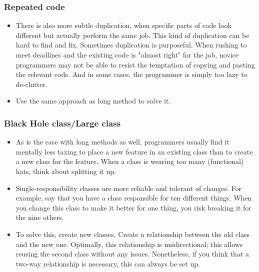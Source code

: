 \documentclass{article}
\begin{document}
\subsubsection{Repeated code}
\begin{itemize}
    \item There is also more subtle duplication, when specific parts of code look different but actually perform the same job. This kind of duplication can be hard to find and fix. Sometimes duplication is purposeful. When rushing to meet deadlines and the existing code is "almost right" for the job, novice programmers may not be able to resist the temptation of copying and pasting the relevant code. And in some cases, the programmer is simply too lazy to de-clutter.
    \item Use the same approach as long method to solve it.
\end{itemize}

\subsubsection{Black Hole class/Large class}
\begin{itemize}
    \item As is the case with long methods as well, programmers usually find it mentally less taxing to place a new feature in an existing class than to create a new class for the feature. When a class is wearing too many (functional) hats, think about splitting it up.
    \item Single-responsibility classes are more reliable and tolerant of changes. For example, say that you have a class responsible for ten different things. When you change this class to make it better for one thing, you risk breaking it for the nine others.
    \item To solve this, create new classes. Create a relationship between the old class and the new one. Optimally, this relationship is unidirectional; this allows reusing the second class without any issues. Nonetheless, if you think that a two-way relationship is necessary, this can always be set up.
\end{itemize}
\end{document}
